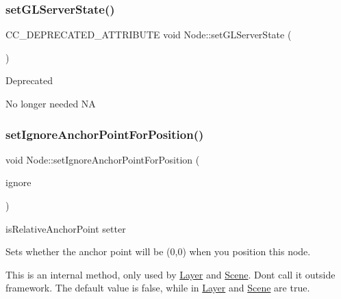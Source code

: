 \subsubsection{\texorpdfstring{set\+G\+L\+Server\+State()}{setGLServerState()}\hspace{0.1cm}{\footnotesize\ttfamily [2/2]}}
{\footnotesize\ttfamily C\+C\+\_\+\+D\+E\+P\+R\+E\+C\+A\+T\+E\+D\+\_\+\+A\+T\+T\+R\+I\+B\+U\+TE void Node\+::set\+G\+L\+Server\+State (\begin{DoxyParamCaption}\item[{int}]{ }\end{DoxyParamCaption})\hspace{0.3cm}{\ttfamily [inline]}}

\begin{DoxyRefDesc}{Deprecated}
\item[\hyperlink{deprecated__deprecated000259}{Deprecated}]No longer needed  NA \end{DoxyRefDesc}
\mbox{\label{classNode_a75e8f6a6a46358d6faf8683e720d47b5}} 
\subsubsection{\texorpdfstring{set\+Ignore\+Anchor\+Point\+For\+Position()}{setIgnoreAnchorPointForPosition()}\hspace{0.1cm}{\footnotesize\ttfamily [1/2]}}
{\footnotesize\ttfamily void Node\+::set\+Ignore\+Anchor\+Point\+For\+Position (\begin{DoxyParamCaption}\item[{bool}]{ignore }\end{DoxyParamCaption})\hspace{0.3cm}{\ttfamily [virtual]}}



is\+Relative\+Anchor\+Point setter 

Sets whether the anchor point will be (0,0) when you position this node.

This is an internal method, only used by \hyperlink{classLayer}{Layer} and \hyperlink{classScene}{Scene}. Don\textquotesingle{}t call it outside framework. The default value is false, while in \hyperlink{classLayer}{Layer} and \hyperlink{classScene}{Scene} are true.


